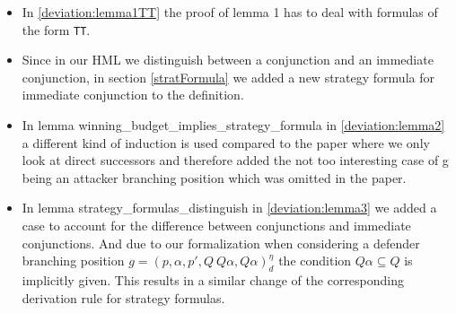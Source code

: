 \begin{itemize}
    \item In \ref{deviation:lemma1TT} the proof of lemma 1 has to deal with formulas of the form \texttt{TT}. 
    
    \item Since in our HML we distinguish between a conjunction and an immediate conjunction, in section \ref{stratFormula} 
    we added a new strategy formula for immediate conjunction to the definition.
    
    \item In lemma winning\_budget\_implies\_strategy\_formula in \ref{deviation:lemma2} a different kind of induction is used compared to the paper 
    where we only look at direct successors and therefore added the not too interesting case of g being an 
    attacker branching position which was omitted in the paper.
    
    \item In lemma strategy\_formulas\_distinguish in  \ref{deviation:lemma3} we added a case to account for the difference between 
    conjunctions and immediate conjunctions. And due to our formalization when considering a
    defender branching position $g=(p,\alpha ,p', Q \ Q\alpha, Q\alpha)_d^\eta$ the condition 
    $Q \alpha \subseteq Q$ is implicitly given.
    This results in a similar change of the corresponding derivation rule for strategy formulas.
\end{itemize}
